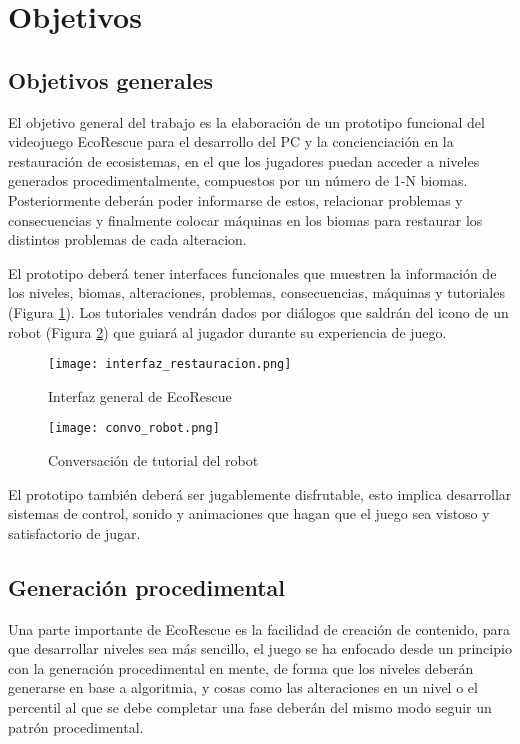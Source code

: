 \raggedbottom
\section{Objetivos}
\subsection{Objetivos generales}
El objetivo general del trabajo es la elaboración de un prototipo funcional del videojuego EcoRescue para el desarrollo del PC y la concienciación en la restauración de ecosistemas, 
en el que los jugadores puedan acceder a niveles generados procedimentalmente, compuestos por un número
de 1-N biomas. Posteriormente deberán poder informarse de estos, relacionar problemas y consecuencias y finalmente 
colocar máquinas en los biomas para restaurar los distintos problemas de cada alteracion.

El prototipo deberá tener interfaces funcionales que muestren la información de los niveles, biomas, alteraciones, problemas, consecuencias, máquinas y tutoriales (Figura \ref{fig:UI}). Los tutoriales vendrán dados por diálogos que saldrán del 
icono de un robot (Figura \ref{fig:robot}) que guiará al jugador durante su experiencia de juego.

\begin{figure}[H]
    \centering
      \texttt{[image: interfaz\_restauracion.png]}
    \caption{Interfaz general de EcoRescue}
    \label{fig:UI}
\end{figure}

\begin{figure}[H]
    \centering
      \texttt{[image: convo\_robot.png]}
    \caption{Conversación de tutorial del robot}
    \label{fig:robot}
\end{figure}

El prototipo también deberá ser jugablemente disfrutable, esto implica desarrollar sistemas de control, sonido y animaciones que hagan que el juego sea vistoso y satisfactorio de jugar.

\subsection{Generación procedimental}

Una parte importante de EcoRescue es la facilidad de creación de contenido, para que desarrollar niveles sea más sencillo, el juego se ha enfocado desde un principio con la generación procedimental en mente, de forma que los niveles deberán generarse en base a algoritmia\cite{FastNoiseLite}, y cosas como las alteraciones en un nivel o el percentil al que se debe completar una fase deberán del mismo modo seguir un patrón procedimental.

